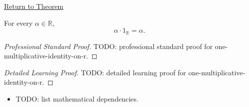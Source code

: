 \newpage
{}
\label{prf:one-multiplicative-identity-on-r}

\begin{remark*}[Return]
\hyperref[thm:one-multiplicative-identity-on-r]{Return to Theorem}
\end{remark*}

\begin{theorem*}
For every $\alpha\in\mathbb{R}$,
\[
\alpha\cdot 1_{\mathbb{R}}=\alpha.
\]
\end{theorem*}

\begin{proof}[Professional Standard Proof]
\LRAProofBodyStart
TODO: professional standard proof for one-multiplicative-identity-on-r.
\end{proof}

\begin{proof}[Detailed Learning Proof]
\LRAProofBodyStart
TODO: detailed learning proof for one-multiplicative-identity-on-r.
\end{proof}

\begin{remark*}
\end{remark*}

\begin{dependencies}
\begin{itemize}
  \item TODO: list mathematical dependencies.
\end{itemize}
\end{dependencies}

\clearpage
